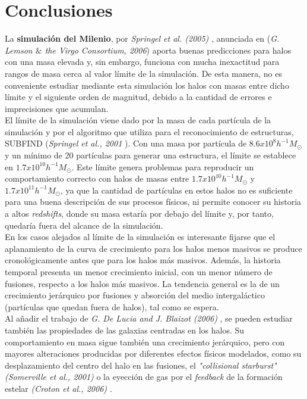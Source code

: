 \section{Conclusiones} 
\label{sec:4}

La \textbf{simulación del Milenio}\cite{6}, por \textit{Springel et al. (2005)} \cite{1}, anunciada en (\textit{G. Lemson $\&$ the Virgo Consortium, 2006}\cite{5}) aporta buenas predicciones para halos con una masa elevada y, sin embargo, funciona con mucha inexactitud para rangos de masa cerca al valor límite de la simulación. De esta manera, no es conveniente estudiar mediante esta simulación los halos con masas entre dicho límite y el siguiente orden de magnitud, debido a la cantidad de errores e imprecisiones que acumulan. \\

El límite de la simulación viene dado por la masa de cada partícula de la simulación y por el algoritmo que utiliza para el reconocimiento de estructuras, SUBFIND (\textit{Springel et al., 2001} \cite{8}). Con una masa por partícula de $8.6x10^{8}h^{-1}M_\odot$ y un mínimo de 20 partículas para generar una estructura, el límite se establece en $1.7x10^{10}h^{-1}M_\odot$. Este límite genera problemas para reproducir un comportamiento correcto con halos de masas entre  $1.7x10^{10}h^{-1}M_{\odot}$ y $1.7x10^{11}h^{-1}M_\odot$, ya que la cantidad de partículas en estos halos no es suficiente para una buena descripción de sus procesos físicos, ni permite conocer su historia a altos \textit{redshifts}, donde su masa estaría por debajo del límite y, por tanto, quedaría fuera del alcance de la simulación. \\

En los casos alejados al límite de la simulación es interesante fijarse que el aplanamiento de la curva de crecimiento para los halos menos masivos se produce cronológicamente antes que para los halos más masivos. Además, la historia temporal presenta un menor crecimiento inicial, con un menor número de fusiones, respecto a los halos más masivos. La tendencia general es la de un crecimiento jerárquico por fusiones y absorción del medio intergaláctico (partículas que quedan fuera de halos), tal como se espera. \\

Al añadir el trabajo de \textit{G. De Lucia and J. Blaizot (2006)} \cite{2}, se pueden estudiar también las propiedades de las galaxias centradas en los halos. Su comportamiento en masa sigue también una crecimiento jerárquico, pero con mayores alteraciones producidas por diferentes efectos físicos modelados, como su desplazamiento del centro del halo en las fusiones, el \textit{"collisional starburst" (Somerville et al., 2001)} \cite{3} o la eyección de gas por el \textit{feedback} de la formación estelar \textit{(Croton et al., 2006)} \cite{10}. \\

